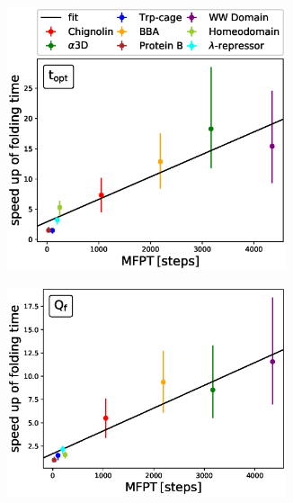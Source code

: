 \begin{figure}[!ht]
  \begin{subfigure}[t]{0.5\textwidth}
    \includegraphics[width=0.9\textwidth]{figures/compare_MD_speed_up_t_opt_6_steps10000_52_0.eps}
  \end{subfigure}
  \begin{subfigure}[t]{0.5\textwidth}
    \includegraphics[width=0.9\textwidth]{figures/compare_MD_speed_up_qcore_only_6_steps10000_52.eps}
  \end{subfigure}
  \begin{subfigure}[t]{0.5\textwidth}

\end{subfigure}
\end{figure}
